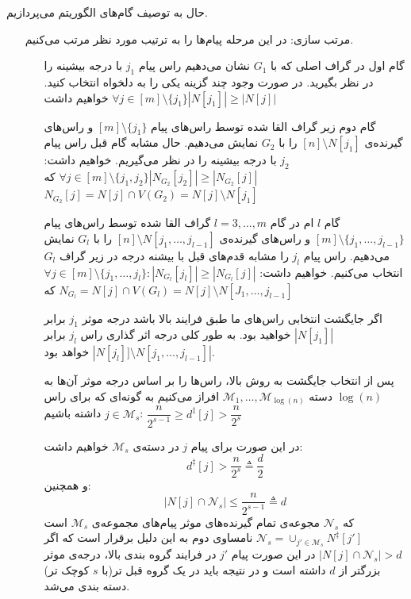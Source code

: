 حال به توصیف گام‌های الگوریتم می‌پردازیم.
\begin{itemize}
	\item[مرتب سازی:]
	در این مرحله پیام‌ها را به ترتیب مورد نظر مرتب می‌کنیم.
		\begin{enumerate}
			\item [گام اول]
			در گراف اصلی که با
			$G_1$
			نشان می‌دهیم راس پیام
			$j_1$
			با درجه بیشینه را در نظر بگیرید. در صورت وجود چند گزینه یکی را به دلخواه انتخاب کنید. خواهیم داشت
			$\forall j \in [m] \setminus \{j_1\} |N[j_1]| \geq |N[j]|$
			\item [گام دوم]
			زیر گراف القا شده توسط راس‌های پیام
			$[m] \setminus \{j_1\}$
			و راس‌های گیرنده‌ی
			$[n] \setminus N[j_1]$
			را با
		   $G_2$
		   نمایش می‌دهیم. حال مشابه گام قبل راس پیام
		   $j_2$
		   با درجه بیشینه را در نظر می‌گیریم. خواهیم داشت:
		   $\forall j \in [m] \setminus \{j_1, j_2\} |N_{G_2}[j_2]| \geq |N_{G_2}[j]|$
		   که
		   $N_{G_2}[j] = N[j] \cap V(G_2) = N[j] \setminus N[j_1]$
			\item [
			گام 
			$l$
			ام
			]
			در گام
			$l = 3, \ldots, m$
			گراف القا شده توسط راس‌های پیام
			$[m] \setminus \{j_1, \ldots, j_{l - 1}\}$
			و راس‌های گیرنده‌ی
			$[n] \setminus N[j_1, \ldots, j_{l-1} ]$
			را با
			$G_l$
			نمایش می‌دهیم. راس پیام
			$j_l$
			را مشابه قدم‌های قبل با بیشنه درجه در زیر گراف
			$G_l$
			 انتخاب می‌کنیم. خواهیم داشت:
			 $\forall j \in [m] \setminus \{j_1, \ldots, j_l\}: |N_{G_l}[j_l]| \geq |N_{G_l} [j]|$
			 که
			 $N_{G_l} = N[j] \cap V(G_l) = N[j] \setminus N[J_1, \ldots, j_{l - 1}] $
			
			اگر جایگشت انتخابی راس‌های ما طبق فرایند بالا باشد درجه موثر 
			$j_1$
			برابر
			$|N[j_1]|$
			 خواهید بود. به طور کلی درجه اثر گذاری راس
			 $j_l$
			 برابر
			 $|N[j_l]]\setminus N[j_1, \ldots, j_{l-1}]|$
			 خواهد بود.
			 
			 پس از انتخاب جایگشت به روش بالا، راس‌ها را بر اساس درجه موثر آن‌ها به
			 $\log(n)$
			 دسته 
			 $\mathcal{M}_1, \ldots, \mathcal{M}_{\log(n)}$
			 افراز می‌کنیم به گونه‌ای که برای راس
			 $j \in \mathcal{M}_s$
			 داشته باشیم:
			 $\dfrac{n}{2^{s - 1}} \geq d^\ddagger[j] > \dfrac{n}{2^s}$
			 
			 در این صورت برای پیام
			 $j$
			 در دسته‌ی
			 $\mathcal{M}_s$
			 خواهیم داشت:
			 $$d^{\ddagger}[j] > \dfrac{n}{2^s} \triangleq \dfrac{d}{2}$$
			 و همچنین:
			 $$|N[j] \cap \mathcal{N}_s| \leq \dfrac{n}{2^{s - 1}} \triangleq d$$
			 که
			 $\mathcal{N}_s$
			 مجوعه‌ی تمام گیرنده‌های موثر پیام‌های مجموعه‌ی
			 $\mathcal{M}_s$
			 است
			 $\mathcal{N}_s = \cup_{j' \in \mathcal{M}_s} N^{\ddagger}[j']$
			 نامساوی دوم به این دلیل برقرار است که اگر
			 $|N[j] \cap \mathcal{N}_s | > d$
			 در این صورت پیام
			 $j'$
			 در فرایند گروه بندی بالا، درجه‌ی موثر بزرگتر از
			 $d$
			 داشته است و در نتیجه باید در یک گروه قبل تر(با
			 $s$
			 کوچک تر) دسته بندی می‌شد.
			 

\end{enumerate}
\end{itemize}

